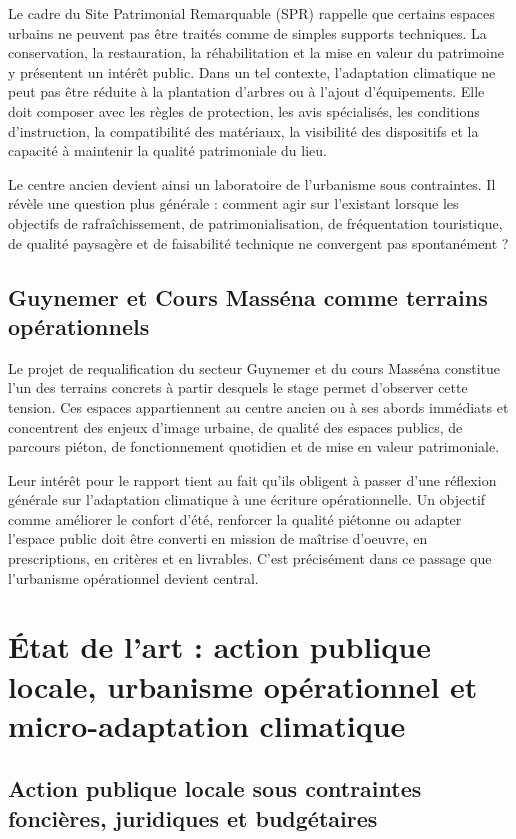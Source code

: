 \documentclass[11pt,a4paper]{report}
\begin{document}
Le cadre du Site Patrimonial Remarquable (SPR) rappelle que certains espaces urbains ne peuvent pas être traités comme de simples supports techniques. La conservation, la restauration, la réhabilitation et la mise en valeur du patrimoine y présentent un intérêt public. Dans un tel contexte, l'adaptation climatique ne peut pas être réduite à la plantation d'arbres ou à l'ajout d'équipements. Elle doit composer avec les règles de protection, les avis spécialisés, les conditions d'instruction, la compatibilité des matériaux, la visibilité des dispositifs et la capacité à maintenir la qualité patrimoniale du lieu.

Le centre ancien devient ainsi un laboratoire de l'urbanisme sous contraintes. Il révèle une question plus générale : comment agir sur l'existant lorsque les objectifs de rafraîchissement, de patrimonialisation, de fréquentation touristique, de qualité paysagère et de faisabilité technique ne convergent pas spontanément ?

\subsection{Guynemer et Cours Masséna comme terrains opérationnels}

Le projet de requalification du secteur Guynemer et du cours Masséna constitue l'un des terrains concrets à partir desquels le stage permet d'observer cette tension. Ces espaces appartiennent au centre ancien ou à ses abords immédiats et concentrent des enjeux d'image urbaine, de qualité des espaces publics, de parcours piéton, de fonctionnement quotidien et de mise en valeur patrimoniale.

Leur intérêt pour le rapport tient au fait qu'ils obligent à passer d'une réflexion générale sur l'adaptation climatique à une écriture opérationnelle. Un objectif comme améliorer le confort d'été, renforcer la qualité piétonne ou adapter l'espace public doit être converti en mission de maîtrise d'oeuvre, en prescriptions, en critères et en livrables. C'est précisément dans ce passage que l'urbanisme opérationnel devient central.

\section{État de l'art : action publique locale, urbanisme opérationnel et micro-adaptation climatique}

\subsection{Action publique locale sous contraintes foncières, juridiques et budgétaires}
\end{document}
